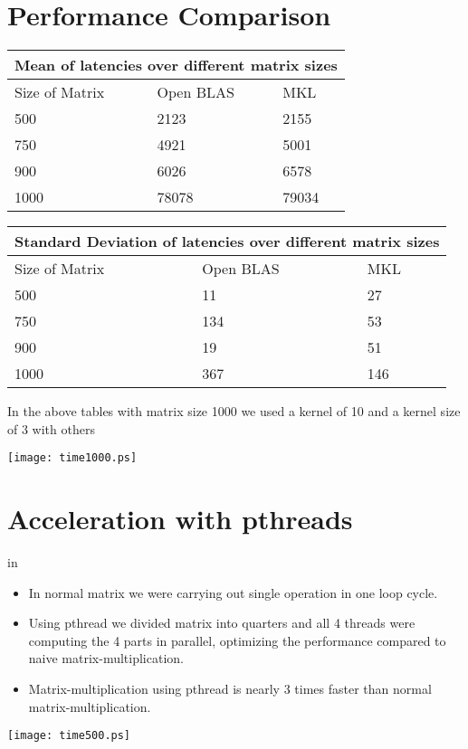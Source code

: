 \documentclass[conf]{new-aiaa}
\begin{document}
\section{Performance Comparison}
\vskip 0.2in
\begin{center}
\begin{tabular}{|p{4cm}|p{4cm}|p{4cm}|}
\hline\hline                        %
\multicolumn{3}{|c|}{Mean of latencies over different matrix sizes} \\
\hline\hline
Size of Matrix & Open BLAS & MKL \\ [2 ex]
\hline
500 & 2123 & 2155  \\%
750 & 4921 & 5001 \\[1ex]
900 & 6026  & 6578  \\[1ex]
1000 & 78078 & 79034 \\[1ex]
\hline
\end{tabular}

\vskip 0.2in

\begin{tabular}{|p{4cm}|p{4cm}|p{4cm}|}
\hline\hline                        %
\multicolumn{3}{|c|}{Standard Deviation of latencies over different matrix sizes} \\
\hline\hline
Size of Matrix & Open BLAS & MKL \\ [2 ex]
\hline
500 & 11 & 27  \\%
750 & 134 & 53  \\[1ex]
900 & 19  & 51  \\[1ex]
1000  & 367 & 146 \\[1ex]
\hline
\end{tabular}
\vskip 0.2in

In the above tables with matrix size 1000 we used a kernel of 10 and a kernel size of 3 with others

\texttt{[image: time1000.ps]} 
\end{center}

\section{Acceleration with pthreads}
 in
\begin{itemize}
  \item In normal matrix we were carrying out single operation in one loop cycle.
  \item Using pthread we divided matrix into quarters and all 4 threads were computing the 4 parts in parallel, optimizing the performance compared to naive matrix-multiplication.
  \item Matrix-multiplication using pthread is nearly 3 times faster than normal matrix-multiplication.
\end{itemize}

\texttt{[image: time500.ps]} 


\end{document}
